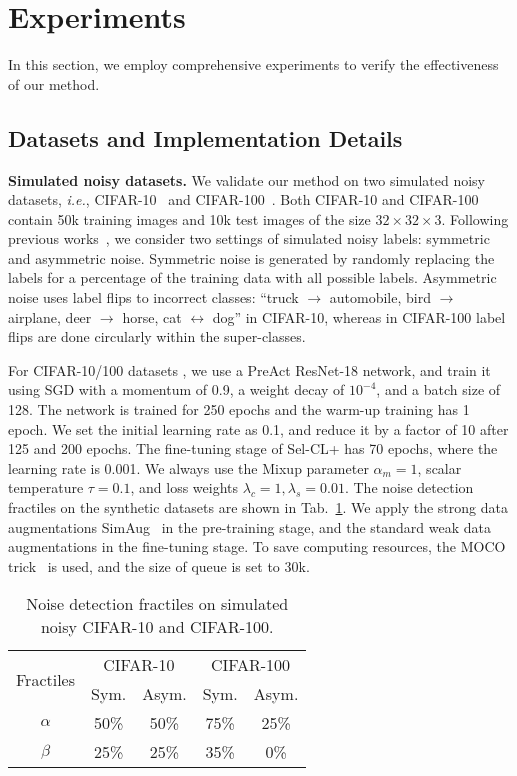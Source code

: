 \documentclass[10pt,twocolumn,letterpaper]{article}
\newcommand{\myPara}[1]{\vspace{.05in}\noindent\textbf{#1}}
\begin{document}
\vspace{-5pt}
\section{Experiments}\label{sec:4}
In this section, we employ comprehensive experiments to verify the effectiveness of our method.
\subsection{Datasets and Implementation Details}\label{sec:4.1}
\vspace{-5pt}
\myPara{Simulated noisy datasets.}
We validate our method on two simulated noisy datasets, \textit{i.e.}, CIFAR-10~\cite{krizhevsky2009learning} and CIFAR-100~\cite{krizhevsky2009learning}. Both CIFAR-10 and CIFAR-100 contain 50k training images and 10k test images of the size $32\times32\times3$. Following previous works~\cite{tanaka2018joint, LiSH20,Ortego2021}, we consider two settings of simulated noisy labels: symmetric and asymmetric noise. Symmetric noise is generated by randomly replacing the labels for a percentage of the training data with all possible labels. Asymmetric noise uses label flips to incorrect classes: ``truck $\rightarrow$ automobile, bird $\rightarrow$ airplane, deer $\rightarrow$ horse, cat $\leftrightarrow$ dog'' in CIFAR-10, whereas in CIFAR-100 label flips are done circularly within the super-classes. 

For CIFAR-10/100 datasets , we use a PreAct ResNet-18 network, and train it using SGD with a momentum of 0.9, a weight decay of $10^{-4}$, and a batch size of 128. The network is trained for 250 epochs and the warm-up training has 1 epoch. We set the initial learning rate as 0.1, and reduce it by a factor of 10 after 125 and 200 epochs. The fine-tuning stage of Sel-CL+ has 70 epochs, where the learning rate is 0.001. We always use the Mixup parameter $\alpha_m=1$, scalar temperature $\tau=0.1$, and loss weights $\lambda_c=1,\lambda_s=0.01$. The noise detection fractiles on the synthetic datasets are shown in Tab.~\ref{fractiles}. We apply the strong data augmentations SimAug~\cite{chen2020simple} in the pre-training stage, and the standard weak data augmentations in the fine-tuning stage. To save computing resources, the MOCO trick~\cite{He0WXG20} is used, and the size of queue is set to 30k.
\begin{table}[t]		
	\caption{Noise detection fractiles on simulated noisy CIFAR-10 and CIFAR-100.}
	\centering
	\small
	\begin{tabular}{c|c|c|c|c}
		\hline \multirow{2}{*}{Fractiles} &\multicolumn{2}{c}{ CIFAR-10} & \multicolumn{2}{|c}{CIFAR-100} \\
		\cline{2-5}
		&  Sym. & Asym.  & Sym. & Asym. \\
		\hline
		$\alpha$ &  50\% & 50\% & 75\% & 25\% \\
		$\beta$ & 25\% & 25\% & 35\% & 0\% \\			
		\hline
	\end{tabular}
	\label{fractiles}
	\vspace{-3pt}
\end{table}
\end{document}
